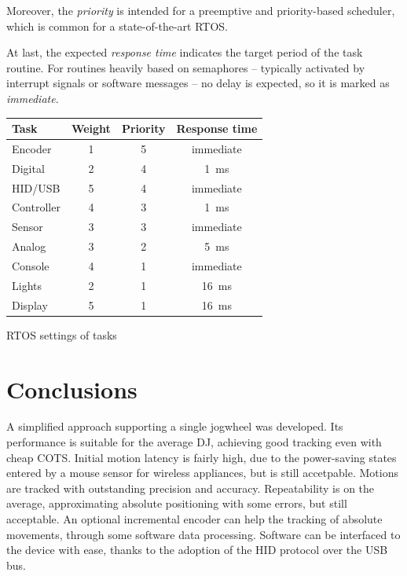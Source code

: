 \documentclass[a4paper,10pt]{article}
\makeatletter
\newenvironment{tablehere}{\def\@captype{table}\vspace{2ex}}{\vspace{2ex}}
\makeatother
\begin{document}
\begin{multicols}{2}
Moreover, the \emph{priority} is intended for a preemptive and priority-based
scheduler, which is common for a state-of-the-art RTOS.

At last, the expected \emph{response time} indicates the target period of the
task routine. For routines heavily based on semaphores -- typically activated
by interrupt signals or software messages -- no delay is expected, so it is
marked as \emph{immediate}.

\begin{tablehere}
\centering \footnotesize
\begin{tabular}{|l|c|c|c|}
\hline
\textbf{Task} & \textbf{Weight} & \textbf{Priority} & \textbf{Response time}	\\
\hline
Encoder		& 1	& 5	& immediate	\\
Digital		& 2	& 4	& 1~ms		\\
HID/USB		& 5	& 4	& immediate	\\
Controller	& 4	& 3	& 1~ms		\\
Sensor		& 3	& 3	& immediate	\\
Analog		& 3	& 2	& 5~ms		\\
Console		& 4	& 1	& immediate	\\
Lights		& 2	& 1	& 16~ms		\\
Display		& 5	& 1	& 16~ms		\\
\hline
\end{tabular}
\caption{RTOS settings of tasks}
\label{tab:fw_adv_tasks}
\end{tablehere}


\section{Conclusions}
\label{sec:conclusions}

A simplified approach supporting a single jogwheel was developed. Its
performance is suitable for the average DJ, achieving good tracking even with
cheap COTS. Initial motion latency is fairly high, due to the power-saving
states entered by a mouse sensor for wireless appliances, but is still
accetpable. Motions are tracked with outstanding precision and accuracy.
Repeatability is on the average, approximating absolute positioning with some
errors, but still acceptable. An optional incremental encoder can help the
tracking of absolute movements, through some software data processing.
Software can be interfaced to the device with ease, thanks to the adoption of
the HID protocol over the USB bus.


\end{multicols}
\end{document}
